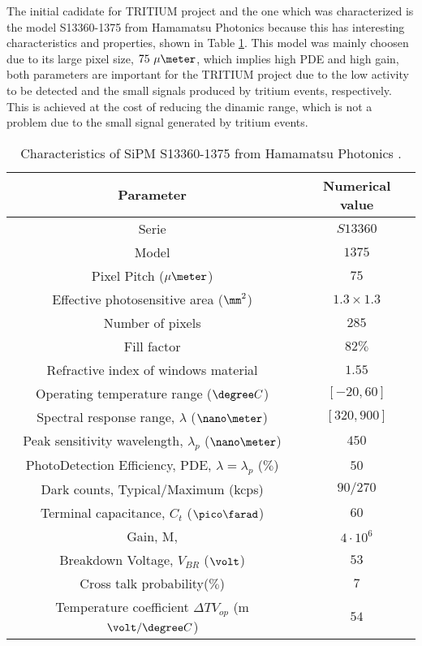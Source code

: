 The initial cadidate for TRITIUM project and the one which was characterized is the model S13360-1375 from Hamamatsu Photonics \cite{DataSheetHammamatsu_1_SiPM_1375} because this has interesting characteristics and properties, shown in Table \ref{tab:PropertiesOfSiPM1375}. This model was mainly choosen due to its large pixel size, $75~\mu\meter$, which implies high PDE and high gain, both parameters are important for the TRITIUM project due to the low activity to be detected and the small signals produced by tritium events, respectively. This is achieved at the cost of reducing the dinamic range, which is not a problem due to the small signal generated by tritium events. 

\begin{table}[htbp]
\begin{center}
\begin{tabular}{|c|c|}
\hline
Parameter & Numerical value \\
\hline \hline \hline
Serie & $S13360$ \\ \hline
Model & $1375$ \\ \hline
Pixel Pitch ($\mu\meter$) & $75$ \\ \hline
Effective photosensitive area ($\mm^2$) & $1.3 \times 1.3$ \\ \hline
Number of pixels & $285$ \\ \hline
Fill factor & $82\%$ \\ \hline
Refractive index of windows material & $1.55$ \\ \hline
Operating temperature range ($\degree C$)& $[-20,60]$ \\ \hline
Spectral response range, $\lambda$ ($\nano\meter$) & $[320, 900]$ \\ \hline
Peak sensitivity wavelength, $\lambda_p$ ($\nano\meter$) & $450$ \\ \hline
PhotoDetection Efficiency, PDE, $\lambda=\lambda_p$ ($\%$) & $50$ \\ \hline
Dark counts, Typical/Maximum (kcps) & $90/270$ \\ \hline
Terminal capacitance, $C_t$ ($\pico\farad$) & $60$ \\ \hline
Gain, M, & $4 \cdot{} 10^6$ \\ \hline
Breakdown Voltage, $V_{BR}$ ($\volt$) & $53$ \\ \hline
Cross talk probability($\%$) & $7$ \\ \hline
Temperature coefficient $\Delta TV_{op}$ (m$\volt/\degree C$) & $54$ \\ \hline
\end{tabular}
\caption{Characteristics of SiPM S13360-1375 from Hamamatsu Photonics \cite{DataSheetHammamatsu_1_SiPM_1375}.}
\label{tab:PropertiesOfSiPM1375}
\end{center}
\end{table}

